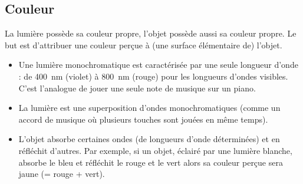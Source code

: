 \documentclass[11pt,class=report,crop=false]{standalone}
\begin{document}
\subsection{Couleur}


La lumière possède sa couleur propre, l'objet possède aussi sa couleur propre. Le but est d'attribuer une couleur perçue à (une surface élémentaire de) l'objet.

\begin{itemize}
  \item Une lumière monochromatique est caractérisée par une seule longueur d'onde : de \SI{400}{\nano\meter} (violet) à \SI{800}{\nano\meter} (rouge) pour les longueurs d'ondes visibles. C'est l'analogue de jouer une seule note de musique sur un piano.

  \item La lumière est une superposition d'ondes monochromatiques (comme un accord de musique où plusieurs touches sont jouées en même temps).

  \item L'objet absorbe certaines ondes (de longueurs d'onde déterminées) et en réfléchit d'autres. 
  Par exemple, si un objet, éclairé par une lumière blanche, absorbe le bleu et réfléchit le rouge et le vert alors sa couleur perçue sera jaune (= rouge + vert).
\end{itemize}

\medskip
\end{document}
